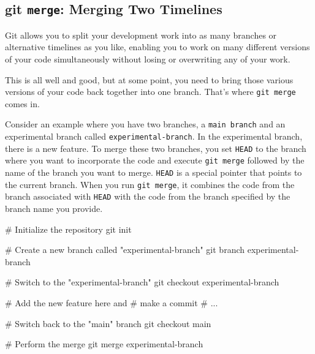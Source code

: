 \documentclass[
  letterpaper,
  DIV=11,
  numbers=noendperiod]{scrreprt}
\newenvironment{Shaded}{\begin{snugshade}}{\end{snugshade}}
\newcommand{\CommentTok}[1]{\textcolor[rgb]{0.37,0.37,0.37}{#1}}
\newcommand{\FunctionTok}[1]{\textcolor[rgb]{0.28,0.35,0.67}{#1}}
\newcommand{\NormalTok}[1]{\textcolor[rgb]{0.00,0.23,0.31}{#1}}
\begin{document}
\hypertarget{git-merge-merging-two-timelines}{%
\subsection{\texorpdfstring{git \texttt{merge}: Merging Two
Timelines}{git merge: Merging Two Timelines}}\label{git-merge-merging-two-timelines}}

Git allows you to split your development work into as many branches or
alternative timelines as you like, enabling you to work on many
different versions of your code simultaneously without losing or
overwriting any of your work.

This is all well and good, but at some point, you need to bring those
various versions of your code back together into one branch. That's
where \texttt{git\ merge} comes in.

Consider an example where you have two branches, a \texttt{main\ branch}
and an experimental branch called \texttt{experimental-branch}. In the
experimental branch, there is a new feature. To merge these two
branches, you set \texttt{HEAD} to the branch where you want to
incorporate the code and execute \texttt{git\ merge} followed by the
name of the branch you want to merge. \texttt{HEAD} is a special pointer
that points to the current branch. When you run \texttt{git\ merge}, it
combines the code from the branch associated with \texttt{HEAD} with the
code from the branch specified by the branch name you provide.

\begin{Shaded}
\begin{Highlighting}[]
\CommentTok{\# Initialize the repository}
\FunctionTok{git}\NormalTok{ init}

\CommentTok{\# Create a new branch called "experimental{-}branch"}
\FunctionTok{git}\NormalTok{ branch experimental{-}branch}

\CommentTok{\# Switch to the "experimental{-}branch"}
\FunctionTok{git}\NormalTok{ checkout experimental{-}branch}

\CommentTok{\# Add the new feature here and}
\CommentTok{\# make a commit}
\CommentTok{\# ...}

\CommentTok{\# Switch back to the "main" branch}
\FunctionTok{git}\NormalTok{ checkout main}

\CommentTok{\# Perform the merge}
\FunctionTok{git}\NormalTok{ merge experimental{-}branch}
\end{Highlighting}
\end{Shaded}
\end{document}

